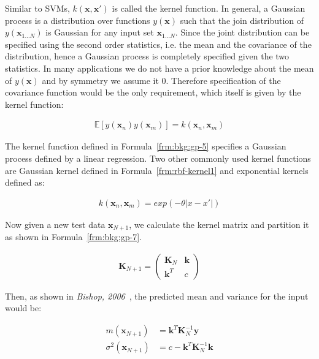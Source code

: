 Similar to SVMs, $k(\mathbf{x},\mathbf{x}')$ is called the kernel function. In general, a Gaussian process is a distribution over functions $y(\mathbf{x})$ such that the join distribution of $y(\mathbf{x}_{1\ldots N})$ is Gaussian for any input set $\mathbf{x}_{1\ldots N}$. Since the joint distribution can be specified using the second order statistics, i.e. the mean and the covariance of the distribution, hence a Gaussian process is completely specified given the two statistics. In many applications we do not have a prior knowledge about the mean of $y(\mathbf{x})$ and by symmetry we assume it $0$. Therefore specification of the covariance function would be the only requirement, which itself is given by the kernel function:

\begin{align}
  \mathbb{E}[y(\mathbf{x}_n)y(\mathbf{x}_m)] = k(\mathbf{x}_n,\mathbf{x}_m)
  \label{frm:bkg:gp-6}
\end{align}

The kernel function defined in Formula~\ref{frm:bkg:gp-5} specifies a Gaussian process defined by a linear regression. Two other commonly used kernel functions are Gaussian kernel defined in Formula~\ref{frm:rbf-kernel1} and exponential kernels defined as:

\begin{align}
  k(\mathbf{x}_n,\mathbf{x}_m) = exp(-\theta |x - x'|)
  \label{frm:bkg:gp-6}
\end{align}

Now given a new test data $\mathbf{x}_{N+1}$, we calculate the kernel matrix and partition it as shown in Formula~\ref{frm:bkg:gp-7}.

\begin{align}
  \mathbf{K}_{N+1} =
  \begin{pmatrix}
    \mathbf{K}_N & \mathbf{k} \\
    \mathbf{k}^T & c
  \end{pmatrix}
  \label{frm:bkg:gp-7}
\end{align}

Then, as shown in \emph{Bishop, 2006}~\cite[Ch. 6.4]{bishop2006pattern}, the predicted mean and variance for the input would be:

\begin{align}
  m(\mathbf{x}_{N+1}) & = \mathbf{k}^T\mathbf{K}_N^{-1}\mathbf{y} \nonumber \\
  \sigma^2(\mathbf{x}_{N+1}) & = c-\mathbf{k}^T\mathbf{K}_N^{-1}\mathbf{k}
  \label{frm:bkg:gp-8}
\end{align}


